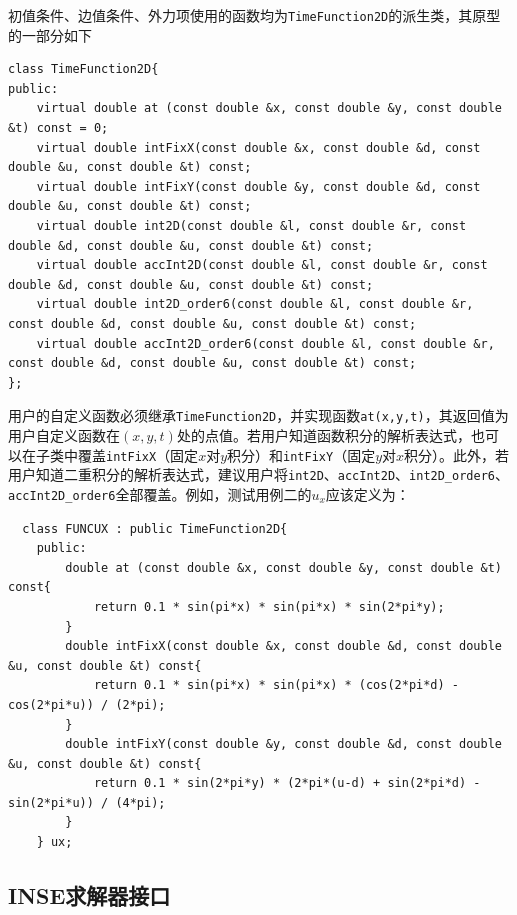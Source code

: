 \documentclass[lang=cn,10pt,bibend=bibtex]{elegantbook}
\begin{document}
初值条件、边值条件、外力项使用的函数均为\verb|TimeFunction2D|的派生类，其原型的一部分如下
\begin{lstlisting}
class TimeFunction2D{
public:
    virtual double at (const double &x, const double &y, const double &t) const = 0;
    virtual double intFixX(const double &x, const double &d, const double &u, const double &t) const;
    virtual double intFixY(const double &y, const double &d, const double &u, const double &t) const;
    virtual double int2D(const double &l, const double &r, const double &d, const double &u, const double &t) const;
    virtual double accInt2D(const double &l, const double &r, const double &d, const double &u, const double &t) const;
    virtual double int2D_order6(const double &l, const double &r, const double &d, const double &u, const double &t) const;
    virtual double accInt2D_order6(const double &l, const double &r, const double &d, const double &u, const double &t) const;
};
\end{lstlisting}

用户的自定义函数必须继承\verb|TimeFunction2D|，并实现函数\verb|at(x,y,t)|，其返回值为用户自定义函数在$(x,y,t)$处的点值。若用户知道函数积分的解析表达式，也可以在子类中覆盖\verb|intFixX|（固定$x$对$y$积分）和\verb|intFixY|（固定$y$对$x$积分）。此外，若用户知道二重积分的解析表达式，建议用户将\verb|int2D|、\verb|accInt2D|、\verb|int2D_order6|、\verb|accInt2D_order6|全部覆盖。例如，测试用例二的$u_x$应该定义为：
\begin{lstlisting}
  class FUNCUX : public TimeFunction2D{
    public:
        double at (const double &x, const double &y, const double &t) const{
            return 0.1 * sin(pi*x) * sin(pi*x) * sin(2*pi*y);
        }
        double intFixX(const double &x, const double &d, const double &u, const double &t) const{
            return 0.1 * sin(pi*x) * sin(pi*x) * (cos(2*pi*d) - cos(2*pi*u)) / (2*pi);
        }
        double intFixY(const double &y, const double &d, const double &u, const double &t) const{
            return 0.1 * sin(2*pi*y) * (2*pi*(u-d) + sin(2*pi*d) - sin(2*pi*u)) / (4*pi);
        }
    } ux;
\end{lstlisting}

\subsection{INSE求解器接口}
\end{document}
